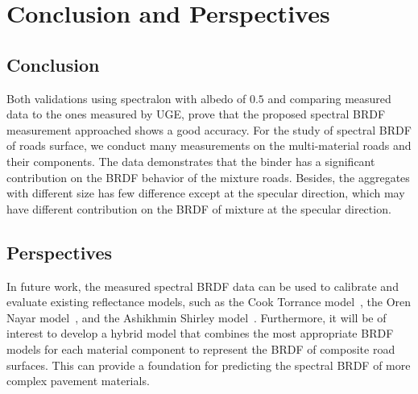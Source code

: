 \chapter{Conclusion and Perspectives}
\section{Conclusion}
Both validations using spectralon with albedo of $0.5$ and comparing measured data to the ones measured by UGE, prove that the proposed spectral BRDF measurement approached shows a good accuracy.
For the study of spectral BRDF of roads surface, we conduct many measurements on the multi-material roads and their components.
The data demonstrates that the binder has a significant contribution on the BRDF behavior of the mixture roads.
Besides, the aggregates with different size has few difference except at the specular direction, which may have different contribution on the BRDF of mixture at the specular direction.


\section{Perspectives}

In future work, the measured spectral BRDF data can be used to calibrate and evaluate existing reflectance models, such as the Cook Torrance model~\cite{1982_Cook}, the Oren Nayar model~\cite{1995_Oren}, and the Ashikhmin Shirley model~\cite{2000_Ashikhmin}. 
Furthermore, it will be of interest to develop a hybrid model that combines the most appropriate BRDF models for each material component to represent the BRDF of composite road surfaces.
This can provide a foundation for predicting the spectral BRDF of more complex pavement materials.